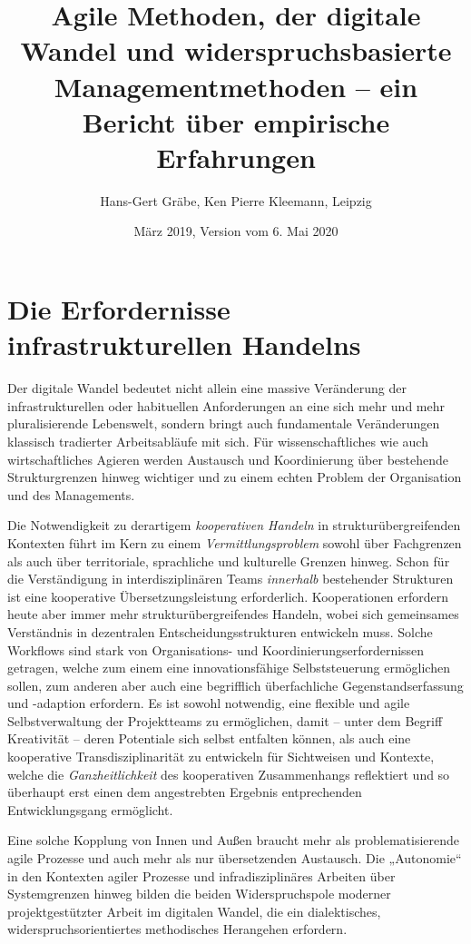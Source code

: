 \documentclass[a4paper,11pt]{article}
\title{Agile Methoden, der digitale Wandel und widerspruchsbasierte
  Managementmethoden – ein Bericht über empirische Erfahrungen}
\author{Hans-Gert Gräbe, Ken Pierre Kleemann, Leipzig}
\date{März 2019, Version vom 6. Mai 2020}
\begin{document}
\maketitle

\section*{Die Erfordernisse infrastrukturellen Handelns}

Der digitale Wandel bedeutet nicht allein eine massive Veränderung der
infrastrukturellen oder habituellen Anforderungen an eine sich mehr und mehr
pluralisierende Lebenswelt, sondern bringt auch fundamentale Veränderungen
klassisch tradierter Arbeitsabläufe mit sich. Für wissenschaftliches wie auch
wirtschaftliches Agieren werden Austausch und Koordinierung über bestehende
Strukturgrenzen hinweg wichtiger und zu einem echten Problem der Organisation
und des Managements.

Die Notwendigkeit zu derartigem \emph{kooperativen Handeln} in
strukturübergreifenden Kontexten führt im Kern zu einem
\emph{Vermittlungsproblem} sowohl über Fachgrenzen als auch über territoriale,
sprachliche und kulturelle Grenzen hinweg. Schon für die Verständigung in
interdisziplinären Teams \emph{innerhalb} bestehender Strukturen ist eine
kooperative Übersetzungsleistung erforderlich.  Kooperationen erfordern heute
aber immer mehr strukturübergreifendes Handeln, wobei sich gemeinsames
Verständnis in dezentralen Entscheidungsstrukturen entwickeln muss. Solche
Workflows sind stark von Organisations- und Koordinierungserfordernissen
getragen, welche zum einem eine innovationsfähige Selbststeuerung ermöglichen
sollen, zum anderen aber auch eine begrifflich überfachliche
Gegenstandserfassung und -adaption erfordern. Es ist sowohl notwendig, eine
flexible und agile Selbstverwaltung der Projektteams zu ermöglichen, damit –
unter dem Begriff Kreativität – deren Potentiale sich selbst entfalten können,
als auch eine kooperative Transdisziplinarität zu entwickeln für Sichtweisen
und Kontexte, welche die \emph{Ganzheitlichkeit} des kooperativen
Zusammenhangs reflektiert und so überhaupt erst einen dem angestrebten
Ergebnis entprechenden Entwicklungsgang ermöglicht.

Eine solche Kopplung von Innen und Außen braucht mehr als problematisierende
agile Prozesse und auch mehr als nur übersetzenden Austausch. Die „Autonomie“
in den Kontexten agiler Prozesse und infradisziplinäres Arbeiten über
Systemgrenzen hinweg bilden die beiden Widerspruchspole moderner
projektgestützter Arbeit im digitalen Wandel, die ein dialektisches,
widerspruchsorientiertes methodisches Herangehen erfordern.
\end{document}
